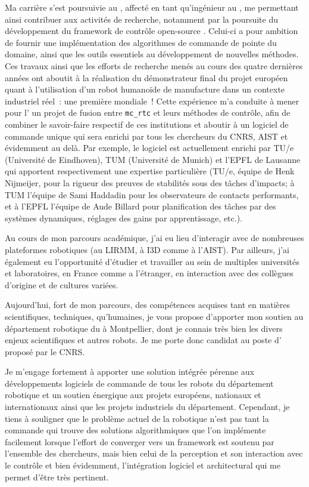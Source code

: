\documentclass[11pt, a4paper]{awesome-cv}
\begin{document}
\begin{cvletter}
Ma carrière s'est poursuivie au , affecté en tant qu'ingénieur au , me permettant ainsi contribuer aux activités de recherche, notamment par la poursuite du développement du framework de contrôle open-source . Celui-ci a pour ambition de fournir une implémentation des algorithmes de commande de pointe du domaine, ainsi que les outils essentiels au développement de nouvelles méthodes. Ces travaux ainsi que les efforts de recherche menés au cours des quatre dernières années ont aboutit à la réalisation du démonstrateur final du projet européen  quant à l'utilisation d'un robot humanoïde de manufacture dans un contexte industriel réel~: une première mondiale~! Cette expérience m'a conduite à mener pour l' un projet de fusion entre {\tt mc\_rtc} et leurs méthodes de contrôle, afin de combiner le savoir-faire respectif de ces institutions et aboutir à un logiciel de commande unique qui sera enrichi par tous les chercheurs du CNRS, AIST et évidemment au delà. Par exemple, le logiciel est actuellement enrichi par TU/e (Université de Eindhoven), TUM (Université de Munich) et l'EPFL de Lausanne qui apportent respectivement une expertise particulière (TU/e, équipe de Henk Nijmeijer, pour la rigueur des preuves de stabilités sous des tâches d'impacts; à TUM l'équipe de Sami Haddadin pour les observateurs de contacts performants, et à l'EPFL l'équipe de Aude Billard pour planification des tâches par des systèmes dynamiques, réglages des gains par apprentissage, etc.).  

Au cours de mon parcours académique, j'ai eu lieu d'interagir avec de nombreuses plateformes robotiques (au LIRMM, à I3D comme à l'AIST). Par ailleurs, j'ai également eu l'opportunité d'étudier et travailler au sein de multiples universités et laboratoires, en France comme a l'étranger, en interaction avec des collègues d'origine et de cultures variées.

Aujourd'hui, fort de mon parcours, des compétences acquises tant en matières scientifiques, techniques, qu'humaines, je vous propose d'apporter mon soutien au département robotique du  à Montpellier, dont je connais très bien les divers enjeux scientifiques et autres robots. Je me porte donc candidat au poste d' proposé par le CNRS.

Je m'engage fortement à apporter une solution intégrée pérenne aux développements logiciels de commande de tous les robots du département robotique et un soutien énergique aux projets européens, nationaux et internationaux ainsi que les projets industriels du département. Cependant, je tiens à souligner que le problème actuel de la robotique n'est pas tant la commande qui trouve des solutions algorithmiques que l'on implémente facilement lorsque l'effort de converger vers un framework est soutenu par l'ensemble des chercheurs, mais bien celui de la perception et son interaction avec le contrôle et bien évidemment, l'intégration logiciel et architectural qui me permet d'être très pertinent.  

\end{cvletter}


\makeletterclosing
\end{document}
